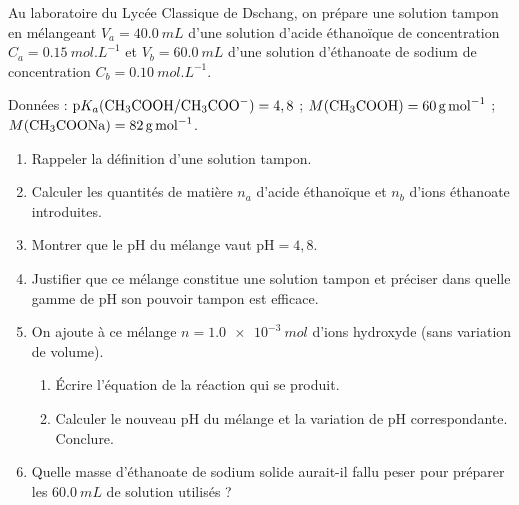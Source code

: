 \documentclass[11pt]{article}
\begin{document}
\begin{exercice}
Au laboratoire du Lycée Classique de Dschang, on prépare une solution tampon en mélangeant $V_a = \SI{40,0}{mL}$ d'une solution d'acide éthanoïque  de concentration $C_a = \SI{0,15}{mol.L^{-1}}$ et $V_b = \SI{60,0}{mL}$ d'une solution d'éthanoate de sodium de concentration $C_b = \SI{0,10}{mol.L^{-1}}$.
\par Données : $\mathrm{p}K_a(\ce{CH3COOH}/\ce{CH3COO-}) = 4,8$ ; $M(\ce{CH3COOH}) = \SI{60}{g.mol^{-1}}$ ; $M(\ce{CH3COONa}) = \SI{82}{g.mol^{-1}}$.
\begin{enumerate}
  \item Rappeler la définition d'une solution tampon.
  \item Calculer les quantités de matière $n_a$ d'acide éthanoïque et $n_b$ d'ions éthanoate introduites.
  \item Montrer que le pH du mélange vaut $\mathrm{pH} = 4,8$.
  \item Justifier que ce mélange constitue une solution tampon et préciser dans quelle gamme de pH son pouvoir tampon est efficace.
  \item On ajoute à ce mélange $n = \SI{1,0e-3}{mol}$ d'ions hydroxyde  (sans variation de volume).
  \begin{enumerate}
    \item Écrire l'équation de la réaction qui se produit.
    \item Calculer le nouveau pH du mélange et la variation de pH correspondante. Conclure.
  \end{enumerate}
  \item Quelle masse d'éthanoate de sodium solide aurait-il fallu peser pour préparer les $\SI{60,0}{mL}$ de solution utilisés ?
\end{enumerate}
\end{exercice}
\end{document}
